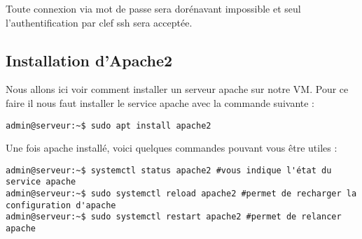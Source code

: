 Toute connexion via mot de passe sera dorénavant impossible et seul l'authentification par clef ssh sera acceptée.





\subsection{Installation d'Apache2}
Nous allons ici voir comment installer un serveur apache sur notre VM. Pour ce faire il nous faut installer le service apache avec la commande suivante : 
\begin{verbatim}
admin@serveur:~$ sudo apt install apache2
\end{verbatim}

Une fois apache installé, voici quelques commandes pouvant vous être utiles :  
\begin{verbatim}
admin@serveur:~$ systemctl status apache2 #vous indique l'état du service apache
admin@serveur:~$ sudo systemctl reload apache2 #permet de recharger la configuration d'apache
admin@serveur:~$ sudo systemctl restart apache2 #permet de relancer apache
\end{verbatim}






















